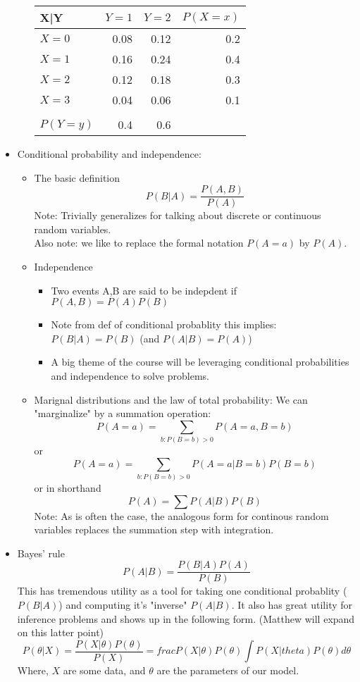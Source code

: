 \documentclass[12pt]{report}
\begin{document}
\begin{itemize}
\begin{itemize}
\begin{center}
\begin{tabular}{lrrr}
\hline
X|Y & $Y=1$ & $Y=2$ & $P(X=x)$\\
\hline
$X=0$ & 0.08 & 0.12 & 0.2\\
$X=1$ & 0.16 & 0.24 & 0.4\\
$X=2$ & 0.12 & 0.18 & 0.3\\
$X=3$ & 0.04 & 0.06 & 0.1\\
 &  &  & \\
\hline
$P(Y=y)$ & 0.4 & 0.6 & \\
\hline
\end{tabular}
\end{center}
\end{itemize}
\item Conditional probability and independence:
\label{sec-1-1-3-3}
\begin{itemize}
\item The basic definition
\label{sec-1-1-3-3-1}
$$P(B|A) = \frac{P(A,B)}{P(A)}$$
Note: Trivially generalizes for talking about discrete or continuous random variables.\\
Also note: we like to replace the formal notation $P(A=a)$ by $P(A)$. 
\item Independence
\label{sec-1-1-3-3-2}
\begin{itemize}
\item Two events A,B are said to be indepdent if $P(A,B)=P(A)P(B)$
\item Note from def of conditional probablity this implies: $P(B|A)=P(B)$ (and $P(A|B)=P(A)$)
\item A big theme of the course will be leveraging conditional probabilities and
independence to solve problems.
\end{itemize}
\item Marignal distributions and the law of total probability:
\label{sec-1-1-3-3-3}
We can "marginalize" by a summation operation:
$$P(A=a)= \sum_{b:P(B=b)>0} P(A=a,B=b)$$ or $$P(A=a)=\sum_{b:P(B=b)>0}
P(A=a|B=b)P(B=b)$$ or in shorthand $$P(A)=\sum P(A|B)P(B)$$
Note: As is often the case, the analogous form for continous random variables
replaces the summation step with integration.
\end{itemize}
\item Bayes' rule
\label{sec-1-1-3-4}
$$P(A|B)=\frac{P(B|A)P(A)}{P(B)}$$
This has tremendous utility as a tool for taking one conditional probablity
($P(B|A)$) and computing it's "inverse" $P(A|B)$.  It also has great utility for
inference problems and shows up in the following form.  (Matthew will expand on this latter point)
$$P(\theta|X)=\frac{P(X|\theta)P(\theta)}{P(X)}=frac{P(X|\theta)P(\theta)}{\int P(X|theta)P(\theta)d\theta} $$
Where, $X$ are some data, and $\theta$ are the parameters of our model.
\end{itemize}
\end{document}
